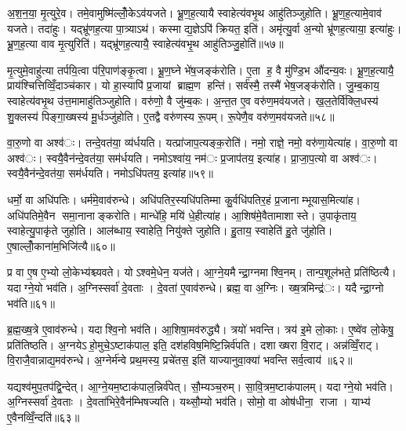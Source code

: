 अ॒श॒न॒या॒ मृ॒त्युरे॒व। तमे॒वामुष्मि॑ल्लोँ॒केऽव॑यजते। भ्रू॒ण॒ह॒त्यायै स्वाहेत्य॑वभृ॒थ आहु॑तिञ्जुहोति। भ्रू॒ण॒ह॒त्यामे॒वाव॑ यजते। तदा॑हुः। यद्भ्रू॑णह॒त्या पा॒त्र्याऽथ॑। कस्माद्य॒ज्ञेऽपि॑ क्रियत॒ इति॑। अमृ॑त्यु॒र्वा अ॒न्यो भ्रू॑णह॒त्याया॒ इत्या॑हुः। भ्रू॒ण॒ह॒त्या वाव मृ॒त्युरिति॑। यद्भ्रू॑णह॒त्यायै॒ स्वाहेत्य॑वभृ॒थ आहु॑तिञ्जु॒होति॑॥५७॥

मृ॒त्युमे॒वाहु॑त्या तर्पयि॒त्वा प॑रि॒पाण॑ङ्कृ॒त्वा। भ्रू॒ण॒घ्ने भे॑ष॒जङ्क॑रोति। ए॒ता ह॒ वै मु॑ण्डि॒भ औ॑दन्य॒वः। भ्रू॒ण॒ह॒त्यायै॒ प्राय॑श्चित्तिव्विँ॒दाञ्च॑कार। यो हा॒स्यापि॑ प्र॒जायां ब्राह्म॒ण हन्ति॑। सर्व॑स्मै॒ तस्मै॑ भेष॒जङ्क॑रोति। जु॒म्ब॒काय॒ स्वाहेत्य॑वभृ॒थ उ॑त्त॒मामाहु॑तिञ्जुहोति। वरु॑णो॒ वै जु॑म्ब॒कः। अ॒न्त॒त ए॒व वरु॑ण॒मव॑यजते। ख॒ल॒तेर्वि॑क्लि॒धस्य॑ शु॒क्लस्य॑ पिङ्गा॒ख्षस्य॑ मू॒र्धञ्जु॑होति। ए॒तद्वै वरु॑णस्य रू॒पम्। रू॒पेणै॒व वरु॑ण॒मव॑यजते॥५८॥


वा॒रु॒णो वा अश्व॑ः। तन्दे॒वत॑या॒ व्य॑र्धयति। यत्प्रा॑जाप॒त्यङ्क॒रोति॑। नमो॒ राज्ञे॒ नमो॒ वरु॑णा॒येत्या॑ह। वा॒रु॒णो वा अश्व॑ः। स्वयै॒वैन॑न्दे॒वत॑या॒ सम॑र्धयति। नमोऽश्वा॑य॒ नम॑ः प्र॒जाप॑तय॒ इत्या॑ह। प्रा॒जा॒प॒त्यो वा अश्व॑ः। स्वयै॒वैन॑न्दे॒वत॑या॒ सम॑र्धयति। नमोऽधि॑पतय॒ इत्या॑ह॥५९॥

धर्मो॒ वा अधि॑पतिः। धर्म॑मे॒वाव॑रुन्धे। अधि॑पतिर॒स्यधि॑पतिम्मा कु॒र्वधि॑पतिर॒हं प्र॒जानाम्भूयास॒मित्या॑ह। अधि॑पतिमे॒वैन समा॒नानाङ्करोति। मान्धे॑हि॒ मयि॑ धे॒हीत्या॑ह। आ॒शिष॑मे॒वैतामाशास्ते। उ॒पाकृ॑ताय॒ स्वाहेत्यु॒पाकृ॑ते जुहोति। आल॑ब्धाय॒ स्वाहेति॒ नियु॑क्ते जुहोति। हु॒ताय॒ स्वाहेति॑ हु॒ते जु॑होति। ए॒षाल्लोँ॒काना॑म॒भिजि॑त्यै॥६०॥

प्र वा ए॒ष ए॒भ्यो लो॒केभ्य॑श्च्यवते। योऽश्वमे॒धेन॒ यज॑ते। आ॒ग्ने॒यमैन्द्रा॒ग्नमाश्वि॒नम्। तान्प॒शूल॑भते॒ प्रति॑ष्ठित्यै। यदाग्ने॒यो भव॑ति। अ॒ग्निस्सर्वा॑ दे॒वताः। दे॒वता॑ ए॒वाव॑रुन्धे। ब्रह्म॒ वा अ॒ग्निः। ख्ष॒त्रमिन्द्र॑ः। यदैन्द्रा॒ग्नो भव॑ति॥६१॥

ब्र॒ह्म॒ख्ष॒त्रे ए॒वाव॑रुन्धे। यदाश्वि॒नो भव॑ति। आ॒शिषा॒मव॑रुद्ध्यै। त्रयो॑ भवन्ति। त्रय॑ इ॒मे लो॒काः। ए॒ष्वे॑व लो॒केषु॒ प्रति॑तिष्ठति। अ॒ग्नयेऽहो॒मुचे॒ऽष्टाक॑पाल॒ इति॒ दश॑हविष॒मिष्टि॒न्निर्व॑पति। दशाख्षरा वि॒राट्। अन्न॑व्विँ॒राट्। वि॒राजै॒वान्नाद्य॒मव॑रुन्धे। अ॒ग्नेर्म॑न्वे प्रथ॒मस्य॒ प्रचे॑तस॒ इति॑ याज्यानुवा॒क्या॑ भवन्ति सर्व॒त्वाय॑ ॥६२॥


यद्यश्व॑मुप॒तप॑द्वि॒न्देत्। आ॒ग्ने॒यम॒ष्टाक॑पाल॒न्निर्व॑पेत्। सौ॒म्यञ्च॒रुम्। सा॒वि॒त्रम॒ष्टाक॑पालम्। यदाग्ने॒यो भव॑ति। अ॒ग्निस्सर्वा॑ दे॒वताः। दे॒वता॑भिरे॒वैन॑म्भिषज्यति। यथ्सौ॒म्यो भव॑ति। सोमो॒ वा ओष॑धीना॒ राजा। याभ्य॑ ए॒वैनव्विँ॒न्दति॑॥६३॥

